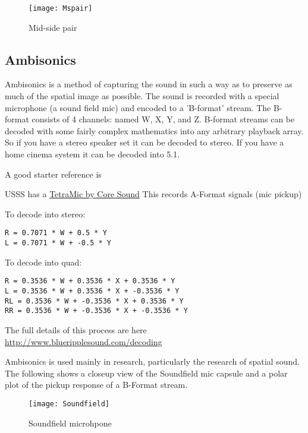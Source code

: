 \begin{figure}[H]
\centering
\texttt{[image: Mspair]}\caption{Mid-side pair}
\label{fig:midsidepair}
\end{figure}


\subsection{Ambisonics}
Ambisonics is a method of capturing the sound in such a way as to preserve as much of the spatial image as possible. The sound is recorded with a special microphone (a sound field mic) and encoded to a 'B-format' stream. The B-format consists of 4 channels: named W, X, Y, and Z. B-format streams can be decoded with some fairly complex mathematics into any arbitrary playback array. So if you have a stereo speaker set it can be decoded to stereo. If you have a home cinema system it can be decoded into 5.1.

A good starter reference is \citep[pp402-407]{rumsey2006sound} 

USSS has a \href{http://www.core-sound.com/TetraMic/1.php}{TetraMic by Core Sound}
This records A-Format signals (mic pickup)

To decode into stereo:
\begin{verbatim} 
R = 0.7071 * W + 0.5 * Y
L = 0.7071 * W + -0.5 * Y
\end{verbatim}

To decode into quad:
\begin{verbatim}
R = 0.3536 * W + 0.3536 * X + 0.3536 * Y
L = 0.3536 * W + 0.3536 * X + -0.3536 * Y
RL = 0.3536 * W + -0.3536 * X + 0.3536 * Y
RR = 0.3536 * W + -0.3536 * X + -0.3536 * Y
\end{verbatim}

The full details of this process are here \url{http://www.blueripplesound.com/decoding}


Ambisonics is used mainly in research, particularly the research of spatial sound. The following shows a closeup view of the Soundfield mic capsule and a polar plot of the pickup response of a B-Format stream.


\begin{figure}[H]
\centering
\texttt{[image: Soundfield]}\caption{Soundfield microhpone}
\label{fig:soundfield}
\end{figure}



\begin{comment}

\begin{figure}[H]
\centering
\texttt{[image: usssinputoutput]}\caption{ussstools input output and sfplay}
\label{fig:usssinputoutput}
\end{figure}

\end{comment}
